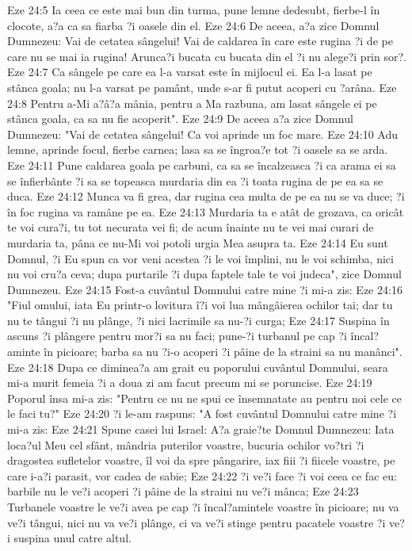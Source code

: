 Eze 24:5  Ia ceea ce este mai bun din turma, pune lemne dedesubt, fierbe-l în clocote, a?a ca sa fiarba ?i oasele din el.
Eze 24:6  De aceea, a?a zice Domnul Dumnezeu: Vai de cetatea sângelui! Vai de caldarea în care este rugina ?i de pe care nu se mai ia rugina! Arunca?i bucata cu bucata din el ?i nu alege?i prin sor?.
Eze 24:7  Ca sângele pe care ea l-a varsat este în mijlocul ei. Ea l-a lasat pe stânca goala; nu l-a varsat pe pamânt, unde s-ar fi putut acoperi cu ?arâna.
Eze 24:8  Pentru a-Mi a?â?a mânia, pentru a Ma razbuna, am lasat sângele ei pe stânca goala, ca sa nu fie acoperit".
Eze 24:9  De aceea a?a zice Domnul Dumnezeu: "Vai de cetatea sângelui! Ca voi aprinde un foc mare.
Eze 24:10  Adu lemne, aprinde focul, fierbe carnea; lasa sa se îngroa?e tot ?i oasele sa se arda.
Eze 24:11  Pune caldarea goala pe carbuni, ca sa se încalzeasca ?i ca arama ei sa se înfierbânte ?i sa se topeasca murdaria din ea ?i toata rugina de pe ea sa se duca.
Eze 24:12  Munca va fi grea, dar rugina cea multa de pe ea nu se va duce; ?i în foc rugina va ramâne pe ea.
Eze 24:13  Murdaria ta e atât de grozava, ca oricât te voi cura?i, tu tot necurata vei fi; de acum înainte nu te vei mai curari de murdaria ta, pâna ce nu-Mi voi potoli urgia Mea asupra ta.
Eze 24:14  Eu sunt Domnul, ?i Eu spun ca vor veni acestea ?i le voi împlini, nu le voi schimba, nici nu voi cru?a ceva; dupa purtarile ?i dupa faptele tale te voi judeca", zice Domnul Dumnezeu.
Eze 24:15  Fost-a cuvântul Domnului catre mine ?i mi-a zis:
Eze 24:16  "Fiul omului, iata Eu printr-o lovitura î?i voi lua mângâierea ochilor tai; dar tu nu te tângui ?i nu plânge, ?i nici lacrimile sa nu-?i curga;
Eze 24:17  Suspina în ascuns ?i plângere pentru mor?i sa nu faci; pune-?i turbanul pe cap ?i încal?aminte în picioare; barba sa nu ?i-o acoperi ?i pâine de la straini sa nu manânci".
Eze 24:18  Dupa ce diminea?a am grait eu poporului cuvântul Domnului, seara mi-a murit femeia ?i a doua zi am facut precum mi se poruncise.
Eze 24:19  Poporul însa mi-a zis: "Pentru ce nu ne spui ce însemnatate au pentru noi cele ce le faci tu?"
Eze 24:20  ?i le-am raspuns: "A fost cuvântul Domnului catre mine ?i mi-a zis:
Eze 24:21  Spune casei lui Israel: A?a graie?te Domnul Dumnezeu: Iata loca?ul Meu cel sfânt, mândria puterilor voastre, bucuria ochilor vo?tri ?i dragostea sufletelor voastre, îl voi da spre pângarire, iax fiii ?i fiicele voastre, pe care i-a?i parasit, vor cadea de sabie;
Eze 24:22  ?i ve?i face ?i voi ceea ce fac eu: barbile nu le ve?i acoperi ?i pâine de la straini nu ve?i mânca;
Eze 24:23  Turbanele voastre le ve?i avea pe cap ?i încal?amintele voastre în picioare; nu va ve?i tângui, nici nu va ve?i plânge, ci va ve?i stinge pentru pacatele voastre ?i ve?i suspina unul catre altul.
